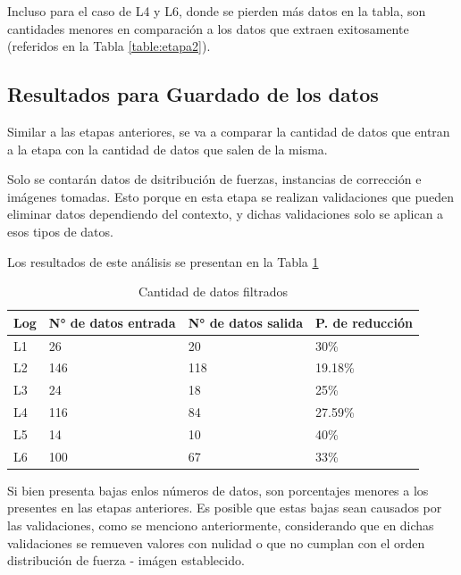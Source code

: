 Incluso para el caso de L4 y L6, donde se pierden más datos en la tabla, son cantidades menores en comparación a los datos que extraen exitosamente (referidos en la Tabla \ref{table:etapa2}).

\subsection{Resultados para Guardado de los datos}

Similar a las etapas anteriores, se va a comparar la cantidad de datos que entran a la etapa con la cantidad de datos que salen de la misma. 

Solo se contarán datos de dsitribución de fuerzas, instancias de corrección e imágenes tomadas. Esto porque en esta etapa se realizan validaciones que pueden eliminar datos dependiendo del contexto, y dichas validaciones solo se aplican a esos tipos de datos.

Los resultados de este análisis se presentan en la Tabla \ref{table:etapa3}


\begin{table}[h]
    \centering
    \caption{\label{table:etapa3} Cantidad de datos filtrados}
    \begin{tabular}{|p{3.5cm}|p{3.5cm}|p{3.5cm}|p{3.5cm}|}
        \hline
        Log & N° de datos entrada & N° de datos salida & P. de reducción \\
        \hline
        L1 & 26 & 20 & 30\% \\
        \hline
        L2 & 146 & 118 & 19.18\% \\
        \hline
        L3 & 24 & 18 & 25\% \\
        \hline        
        L4 & 116 & 84 & 27.59\% \\
        \hline
        L5 & 14 & 10 & 40\% \\
        \hline
        L6 & 100 & 67 & 33\% \\
    \end{tabular}
\end{table}

Si bien presenta bajas enlos números de datos, son porcentajes menores a los presentes en las etapas anteriores. Es posible que estas bajas sean causados por las validaciones, como se menciono anteriormente, considerando que en dichas validaciones se remueven valores con nulidad o que no cumplan con el orden distribución de fuerza - imágen establecido.